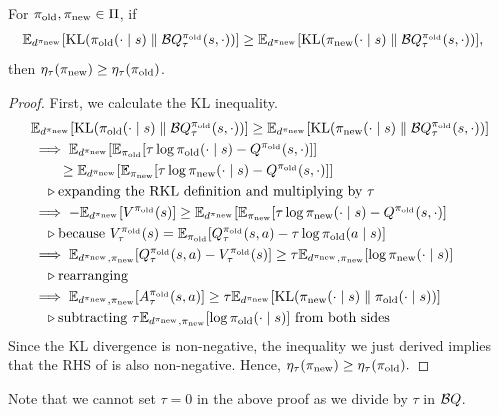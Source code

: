 \documentclass[\main/thesis.tex]{subfiles}
\begin{document}
\begin{proposition}\label{prop:avg-reverse-kl}
For ${\pi_\mathrm{old}}, {\pi_\mathrm{new}} \in \Pi$, if
\begin{align}\label{eq:avg-rev-kl-policy-assumption}
    \mathbb{E}_{d^{{\pi_\mathrm{new}}}}&[\mathrm{KL}({\pi_\mathrm{old}}(\cdot \mid s) \parallel \mathcal{B}Q_\tau^{{\pi_\mathrm{old}}}(s, \cdot))] \geq \mathbb{E}_{d^{{\pi_\mathrm{new}}}}[\mathrm{KL}({\pi_\mathrm{new}}(\cdot \mid s) \parallel \mathcal{B}Q_\tau^{{\pi_\mathrm{old}}}(s, \cdot))], \nonumber
\end{align}
then $\eta_\tau({\pi_\mathrm{new}}) \geq \eta_\tau({\pi_\mathrm{old}})$.

\end{proposition}
\begin{proof}
First, we calculate the KL inequality.
\begin{align*}
    &\mathbb{E}_{d^{{\pi_\mathrm{new}}}}[\mathrm{KL}({\pi_\mathrm{old}}(\cdot \mid s) \parallel \mathcal{B}Q_\tau^{{\pi_\mathrm{old}}}(s, \cdot))] \geq \mathbb{E}_{d^{{\pi_\mathrm{new}}}}[\mathrm{KL}({\pi_\mathrm{new}}(\cdot \mid s) \parallel \mathcal{B}Q_\tau^{{\pi_\mathrm{old}}}(s, \cdot))]\\
    &\implies \mathbb{E}_{d^{{\pi_\mathrm{new}}}}[\mathbb{E}_{{\pi_\mathrm{old}}}[\tau \log {\pi_\mathrm{old}}(\cdot \mid s) - Q^{{\pi_\mathrm{old}}}(s,\cdot)]] \\
    & \quad\quad\geq \mathbb{E}_{d^{{\pi_\mathrm{new}}}}[\mathbb{E}_{{\pi_\mathrm{new}}}[\tau \log {\pi_\mathrm{new}}(\cdot \mid s) - Q^{{\pi_\mathrm{old}}}(s, \cdot)]]\\
    &\quad \triangleright \text{expanding the RKL definition and multiplying by } \tau\\
    &\implies -\mathbb{E}_{d^{{\pi_\mathrm{new}}}}[V^{{\pi_\mathrm{old}}}(s)] \geq \mathbb{E}_{d^{{\pi_\mathrm{new}}}}[\mathbb{E}_{{\pi_\mathrm{new}}}[\tau \log {\pi_\mathrm{new}}(\cdot \mid s) - Q^{{\pi_\mathrm{old}}}(s, \cdot)]\\
    &\quad \triangleright \text{because } V^{\pi_\mathrm{old}}_\tau(s) = \mathbb{E}_{\pi_\mathrm{old}}[Q^{\pi_\mathrm{old}}_\tau(s, a) - \tau \log {\pi_\mathrm{old}}(a \mid s)]\\
    &\implies \mathbb{E}_{d^{{\pi_\mathrm{new}}}, {\pi_\mathrm{new}}}[Q^{{\pi_\mathrm{old}}}_\tau(s, a) - V^{{\pi_\mathrm{old}}}_\tau(s)] \geq \tau \mathbb{E}_{d^{{\pi_\mathrm{new}}}, {\pi_\mathrm{new}}}[\log {\pi_\mathrm{new}}(\cdot \mid s)]\\
    &\quad \triangleright \text{rearranging}\\
    &\implies \mathbb{E}_{d^{{\pi_\mathrm{new}}}, {\pi_\mathrm{new}}}[A_\tau^{{\pi_\mathrm{old}}}(s, a)] \geq \tau \mathbb{E}_{d^{{\pi_\mathrm{new}}}}[\mathrm{KL}({\pi_\mathrm{new}}(\cdot \mid s) \parallel {\pi_\mathrm{old}}(\cdot \mid s))]\\
    &\quad \triangleright \text{subtracting } \tau \mathbb{E}_{d^{\pi_\mathrm{new}}, {\pi_\mathrm{new}}}[\log {\pi_\mathrm{old}}(\cdot \mid s) ] \text{ from both sides}
\end{align*}
%
Since the KL divergence is non-negative, the inequality we just derived implies that the RHS of  is also non-negative. Hence, $\eta_\tau({\pi_\mathrm{new}}) \geq \eta_\tau({\pi_\mathrm{old}}).$
\end{proof}
\noindent Note that we cannot set $\tau = 0$ in the above proof as we divide by $\tau$ in $\mathcal{B}Q$. 
\end{document}
